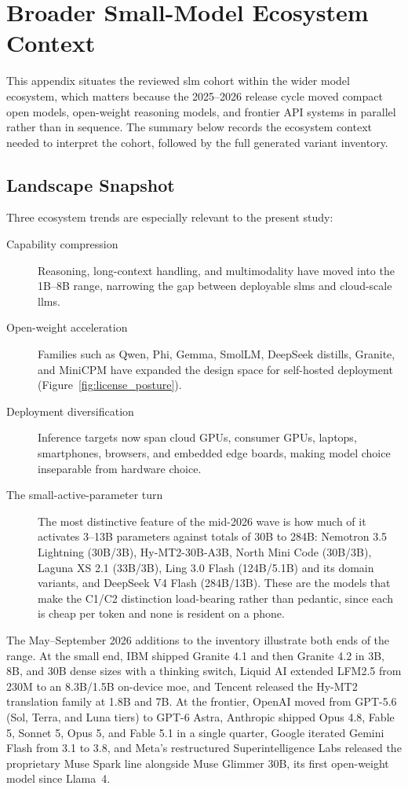 \section{Broader Small-Model Ecosystem Context}
\label{appendix:ecosystem}

This appendix situates the reviewed \gls{slm} cohort within the wider model ecosystem, which matters because the 2025--2026 release cycle moved compact open models, open-weight reasoning models, and frontier API systems in parallel rather than in sequence. The summary below records the ecosystem context needed to interpret the cohort, followed by the full generated variant inventory.

\subsection{Landscape Snapshot}
\label{subsec:ecosystem_snapshot}
Three ecosystem trends are especially relevant to the present study:
\begin{description}
    \item[Capability compression] Reasoning, long-context handling, and multimodality have moved into the 1B--8B range, narrowing the gap between deployable \glspl{slm} and cloud-scale \glspl{llm}.
    \item[Open-weight acceleration] Families such as Qwen, Phi, Gemma, SmolLM, DeepSeek distills, Granite, and MiniCPM have expanded the design space for self-hosted deployment (Figure~\ref{fig:license_posture}).
    \item[Deployment diversification] Inference targets now span cloud GPUs, consumer GPUs, laptops, smartphones, browsers, and embedded edge boards, making model choice inseparable from hardware choice.
    \item[The small-active-parameter turn] The most distinctive feature of the mid-2026 wave is how much of it activates 3--13B parameters against totals of 30B to 284B: Nemotron 3.5 Lightning (30B/3B), Hy-MT2-30B-A3B, North Mini Code (30B/3B), Laguna XS 2.1 (33B/3B), Ling 3.0 Flash (124B/5.1B) and its domain variants, and DeepSeek V4 Flash (284B/13B). These are the models that make the C1/C2 distinction load-bearing rather than pedantic, since each is cheap per token and none is resident on a phone.
\end{description}

The May--September 2026 additions to the inventory illustrate both ends of the range. At the small end, IBM shipped Granite 4.1 and then Granite 4.2 in 3B, 8B, and 30B dense sizes with a thinking switch, Liquid AI extended LFM2.5 from 230M to an 8.3B/1.5B on-device \gls{moe}, and Tencent released the Hy-MT2 translation family at 1.8B and 7B. At the frontier, OpenAI moved from GPT-5.6 (Sol, Terra, and Luna tiers) to GPT-6 Astra, Anthropic shipped Opus 4.8, Fable 5, Sonnet 5, Opus 5, and Fable 5.1 in a single quarter, Google iterated Gemini Flash from 3.1 to 3.8, and Meta's restructured Superintelligence Labs released the proprietary Muse Spark line alongside Muse Glimmer 30B, its first open-weight model since Llama~4.

